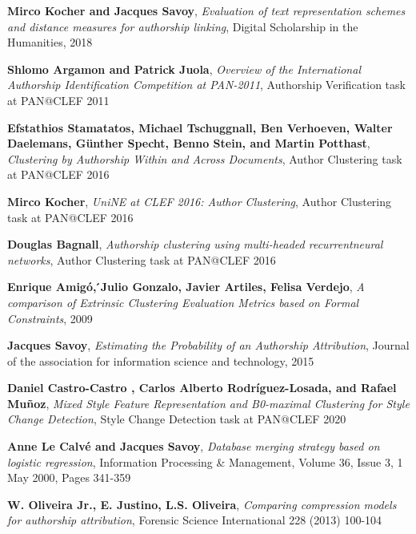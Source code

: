 \begin{thebibliography}{9}


\textbf{Mirco Kocher and Jacques Savoy},
\textit{Evaluation of text representation schemes and distance measures for authorship linking},
Digital Scholarship in the Humanities, 2018

\textbf{Shlomo Argamon and Patrick Juola},
\textit{Overview of the International Authorship Identification Competition at PAN-2011},
Authorship Verification task at PAN@CLEF 2011

\textbf{Efstathios Stamatatos, Michael Tschuggnall, Ben Verhoeven, Walter Daelemans, Günther Specht, Benno Stein, and Martin Potthast},
\textit{Clustering by Authorship Within and Across Documents},
Author Clustering task at PAN@CLEF 2016

\textbf{Mirco Kocher},
\textit{UniNE at CLEF 2016: Author Clustering},
Author Clustering task at PAN@CLEF 2016

\textbf{Douglas Bagnall},
\textit{Authorship clustering using multi-headed recurrentneural networks},
Author Clustering task at PAN@CLEF 2016


\textbf{Enrique Amigó, ́Julio Gonzalo, Javier Artiles, Felisa Verdejo},
\textit{A comparison of Extrinsic Clustering Evaluation Metrics based on Formal Constraints},
2009

\textbf{Jacques Savoy},
\textit{Estimating the Probability of an Authorship Attribution},
Journal of the association for information science and technology, 2015

\textbf{Daniel Castro-Castro , Carlos Alberto Rodríguez-Losada, and Rafael Muñoz},
\textit{Mixed Style Feature Representation and B0-maximal Clustering for Style Change Detection},
Style Change Detection task at PAN@CLEF 2020

\textbf{Anne Le Calvé and Jacques Savoy},
\textit{Database merging strategy based on logistic regression},
Information Processing \& Management, Volume 36, Issue 3, 1 May 2000, Pages 341-359

\textbf{W. Oliveira Jr., E. Justino, L.S. Oliveira},
\textit{Comparing compression models for authorship attribution},
Forensic Science International 228 (2013) 100-104


\end{thebibliography}
